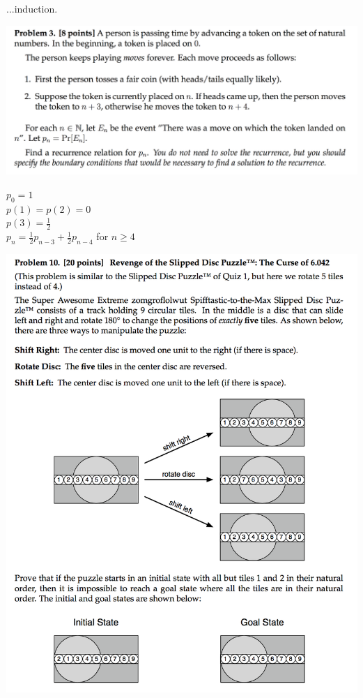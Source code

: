 \documentclass[12pt]{article}
\begin{document}
...induction.

\newpage
\begin{mdframed}
\includegraphics[width=400pt]{img/MIT-math-for-cs-2006-3.png}
\end{mdframed}
$p_0 = 1$\\
$p(1) = p(2) = 0$\\
$p(3) = \frac{1}{2}$\\
$p_n = \frac{1}{2}p_{n-3} + \frac{1}{2}p_{n-4}$ for $n \geq 4$\\

\newpage
\begin{mdframed}
\includegraphics[width=400pt]{img/MIT-math-for-cs-2008-10.png}
\end{mdframed}
\end{document}
